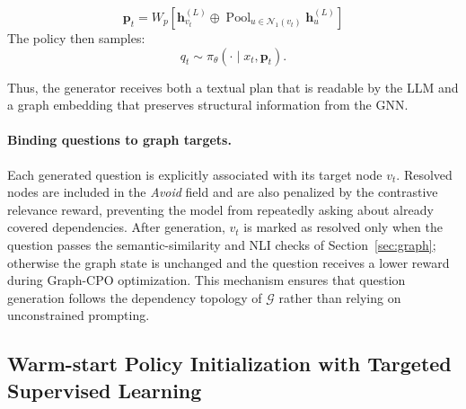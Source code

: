 \documentclass[sigconf, anonymous, review, screen]{acmart}
\begin{document}
\begin{equation}
\mathbf{p}_t = W_p \left[\mathbf{h}^{(L)}_{v_t} \oplus \operatorname{Pool}_{u \in \mathcal{N}_1(v_t)} \mathbf{h}^{(L)}_u\right]
\end{equation}
The policy then samples:
\begin{equation}
q_t \sim \pi_\theta(\cdot \mid x_t,\mathbf{p}_t).
\end{equation}

Thus, the generator receives both a textual plan that is readable by the LLM and a graph embedding that preserves structural information from the GNN.

\paragraph{Binding questions to graph targets.}
Each generated question is explicitly associated with its target node $v_t$. Resolved nodes are included in the \textit{Avoid} field and are also penalized by the contrastive relevance reward, preventing the model from repeatedly asking about already covered dependencies. After generation, $v_t$ is marked as resolved only when the question passes the semantic-similarity and NLI checks of Section~\ref{sec:graph}; otherwise the graph state is unchanged and the question receives a lower reward during Graph-CPO optimization. This mechanism ensures that question generation follows the dependency topology of $\mathcal{G}$ rather than relying on unconstrained prompting.


\subsection{Warm-start Policy Initialization with Targeted Supervised Learning}
\label{sec:init}
\end{document}
